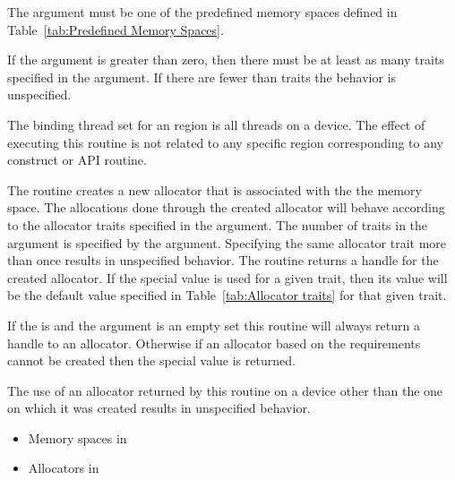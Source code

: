 \constraints

The  argument must be one of the predefined memory spaces defined in Table~\ref{tab:Predefined Memory Spaces}.

If the  argument is greater than zero, then there must be at least as many traits
specified in the  argument. If there are fewer than  traits the behavior is
unspecified.

\binding

The binding thread set for an  region is all threads on a device.
The effect of executing this routine is not related to any specific region corresponding to any construct or API routine.

\effect

The  routine creates a new allocator that is associated with the the  memory space. 
The allocations done through the created allocator will behave according to the allocator traits specified in the  argument.  The number of traits in the  argument is specified by the  argument. Specifying the same allocator trait more than once results in unspecified behavior. The routine returns a handle for the created allocator. If the special  value is used for a given trait, then its value will be the default value specified in Table~\ref{tab:Allocator traits} for that given trait.

If the  is  and the  argument is an empty set this routine will always return a handle to an allocator. Otherwise if an allocator based on the requirements cannot be created then the special value  is returned.

The use of an allocator returned by this routine on a device other than the one on which it was created results in unspecified behavior.

\crossreferences
\begin{itemize}
\item Memory spaces in 
\item Allocators in 
\end{itemize}

\subsection{}
\label{subsec:omp_destroy_allocator}

